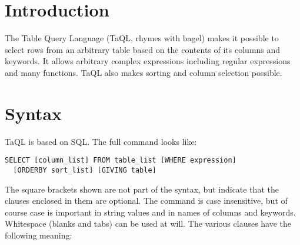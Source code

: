 
\section{Introduction}
The Table Query Language (TaQL, rhymes with bagel) makes
it possible to select
rows from an arbitrary table based on the contents of its
columns and keywords. It allows arbitrary complex
expressions including regular expressions and many functions.
TaQL also makes sorting and column selection possible.

\section{Syntax}
TaQL is based on SQL. The full command looks like:
\begin{verbatim}
SELECT [column_list] FROM table_list [WHERE expression]
  [ORDERBY sort_list] [GIVING table]
\end{verbatim}
The square brackets shown are not part of the syntax, but indicate
that the clauses enclosed in them are optional. The command is case
insensitive, but of course case is important in string values and
in names of columns and keywords. Whitespace (blanks and tabs) can
be used at will.
The various clauses have the following meaning:
